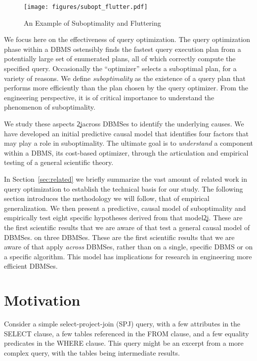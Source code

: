 \documentclass[prodmode,acmtods]{acmsmall}
\begin{document}
\begin{figure}[t]
\centering
\texttt{[image: figures/subopt\_flutter.pdf]}
\caption{An Example of Suboptimality and Fluttering\label{fig:query769}}
\end{figure}

We focus here on the effectiveness of query
optimization. The query optimization phase within a \hbox{DBMS} ostensibly finds the fastest
query execution plan from a potentially large set of enumerated plans, all of
which correctly compute the specified query. Occasionally the \hbox{``optimizer''}
selects a suboptimal plan, for a variety of reasons. We define {\em
  suboptimality} as the existence of a query plan that performs more
efficiently than the plan chosen by the query optimizer. From the engineering
perspective, it is of critical importance to understand the phenomenon of
suboptimality.

We study these aspects \c2j{}{across \hbox{DBMSes}} to identify the
underlying causes. We have developed an initial predictive causal model that
identifies four 
factors that may play a role in suboptimality. The ultimate goal is to {\em
  understand} a component within a \hbox{DBMS}, its cost-based optimizer, through the
articulation and empirical testing of a general scientific theory.

In Section~\ref{sec:related} we briefly summarize the vast amount of related
work in query optimization to establish the technical basis for our study.
The following section introduces the methodology we will follow, that of
empirical generalization. We then present a predictive, causal model of
suboptimality and empirically test eight specific hypotheses derived from that
model\c2j{. These are the first scientific results that we are aware of that
  test a general causal model of \hbox{DBMSes}.}{ on three \hbox{DBMSes}.
  These are the first scientific results that we are aware of that apply
  {\em across} \hbox{DBMSes}, rather than on a single, specific \hbox{DBMS} or on a
  specific algorithm.} This model has implications for research in
engineering more efficient \hbox{DBMSes}.

\section{Motivation}\label{sec:motivation}

Consider a simple select-project-join (SPJ) query, with a few attributes in
the SELECT clause, a few tables referenced in the FROM clause,
and a few equality predicates in the WHERE clause. This query might be an
excerpt from a more complex query, with the tables being intermediate
results.
\end{document}
